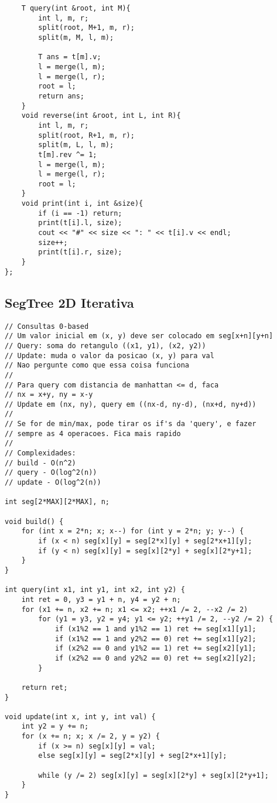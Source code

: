 \documentclass[12pt, a4paper, twoside]{article}
\begin{document}
\begin{lstlisting}
	T query(int &root, int M){
		int l, m, r;
		split(root, M+1, m, r);
		split(m, M, l, m);

		T ans = t[m].v;
		l = merge(l, m);
		l = merge(l, r);
		root = l;
		return ans; 
	}
	void reverse(int &root, int L, int R){
		int l, m, r;
		split(root, R+1, m, r);
		split(m, L, l, m);
		t[m].rev ^= 1;
		l = merge(l, m);
		l = merge(l, r);
		root = l;
	}
	void print(int i, int &size){
		if (i == -1) return;
		print(t[i].l, size);
		cout << "#" << size << ": " << t[i].v << endl;
		size++;
		print(t[i].r, size);
	}
};
\end{lstlisting}

\subsection{SegTree 2D Iterativa}
\begin{lstlisting}
// Consultas 0-based
// Um valor inicial em (x, y) deve ser colocado em seg[x+n][y+n]
// Query: soma do retangulo ((x1, y1), (x2, y2))
// Update: muda o valor da posicao (x, y) para val
// Nao pergunte como que essa coisa funciona
//
// Para query com distancia de manhattan <= d, faca
// nx = x+y, ny = x-y
// Update em (nx, ny), query em ((nx-d, ny-d), (nx+d, ny+d))
//
// Se for de min/max, pode tirar os if's da 'query', e fazer
// sempre as 4 operacoes. Fica mais rapido
//
// Complexidades:
// build - O(n^2)
// query - O(log^2(n))
// update - O(log^2(n))

int seg[2*MAX][2*MAX], n;

void build() {
	for (int x = 2*n; x; x--) for (int y = 2*n; y; y--) {
		if (x < n) seg[x][y] = seg[2*x][y] + seg[2*x+1][y];
		if (y < n) seg[x][y] = seg[x][2*y] + seg[x][2*y+1];
	}
}

int query(int x1, int y1, int x2, int y2) {
	int ret = 0, y3 = y1 + n, y4 = y2 + n;
	for (x1 += n, x2 += n; x1 <= x2; ++x1 /= 2, --x2 /= 2)
		for (y1 = y3, y2 = y4; y1 <= y2; ++y1 /= 2, --y2 /= 2) {
			if (x1%2 == 1 and y1%2 == 1) ret += seg[x1][y1];
			if (x1%2 == 1 and y2%2 == 0) ret += seg[x1][y2];
			if (x2%2 == 0 and y1%2 == 1) ret += seg[x2][y1];
			if (x2%2 == 0 and y2%2 == 0) ret += seg[x2][y2];
		}
	
	return ret;
}

void update(int x, int y, int val) {
	int y2 = y += n;
	for (x += n; x; x /= 2, y = y2) {
		if (x >= n) seg[x][y] = val;
		else seg[x][y] = seg[2*x][y] + seg[2*x+1][y];
		
		while (y /= 2) seg[x][y] = seg[x][2*y] + seg[x][2*y+1];
	}
}
\end{lstlisting}
\end{document}
